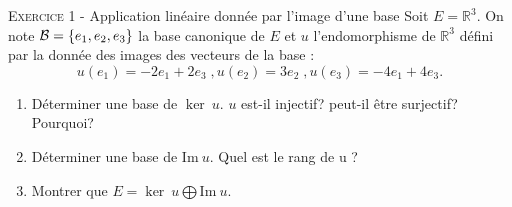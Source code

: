 

\newcommand{\mtn}{\mathbb{N}}
\newcommand{\mtns}{\mathbb{N}^*}
\newcommand{\mtz}{\mathbb{Z}}
\newcommand{\mtr}{\mathbb{R}}
\newcommand{\mtk}{\mathbb{K}}
\newcommand{\mtq}{\mathbb{Q}}
\newcommand{\mtc}{\mathbb{C}}
\newcommand{\mch}{\mathcal{H}}
\newcommand{\mcp}{\mathcal{P}}
\newcommand{\mcb}{\mathcal{B}}
\newcommand{\mcl}{\mathcal{L}}
\newcommand{\mcm}{\mathcal{M}}
\newcommand{\mcc}{\mathcal{C}}
\newcommand{\mcmn}{\mathcal{M}}
\newcommand{\mcmnr}{\mathcal{M}_n(\mtr)}
\newcommand{\mcmnk}{\mathcal{M}_n(\mtk)}
\newcommand{\mcsn}{\mathcal{S}_n}
\newcommand{\mcs}{\mathcal{S}}
\newcommand{\mcd}{\mathcal{D}}
\newcommand{\mcsns}{\mathcal{S}_n^{++}}
\newcommand{\glnk}{GL_n(\mtk)}
\newcommand{\mnr}{\mathcal{M}_n(\mtr)}
\DeclareMathOperator{\ch}{ch}
\DeclareMathOperator{\sh}{sh}
\DeclareMathOperator{\vect}{vect}
\DeclareMathOperator{\card}{card}
\DeclareMathOperator{\comat}{comat}
\DeclareMathOperator{\imv}{Im}
\DeclareMathOperator{\rang}{rg}
\DeclareMathOperator{\Fr}{Fr}
\DeclareMathOperator{\diam}{diam}
\DeclareMathOperator{\supp}{supp}
\newcommand{\veps}{\varepsilon}
\newcommand{\mcu}{\mathcal{U}}
\newcommand{\mcun}{\mcu_n}
\newcommand{\dis}{\displaystyle}
\newcommand{\croouv}{[\![}
\newcommand{\crofer}{]\!]}
\newcommand{\rab}{\mathcal{R}(a,b)}
\newcommand{\pss}[2]{\langle #1,#2\rangle}

 

\begin{center}\textsc{{\huge }}\end{center}



\vskip0.3cm\noindent\textsc{Exercice 1} - Application linéaire donnée par l'image d'une base
\vskip0.2cm
Soit $E=\mathbb R^3$. On note ${\cal B}=\{e_1,e_2,e_3\}$ la base canonique de $E$ et $u$ l'endomorphisme de $\mathbb R^3$ défini par la donnée des images des vecteurs de la base : 
$$u(e_1) = -2e_1 +2e_3 \; , u(e_2)=3e_2 \; , u(e_3)=-4e_1 + 4e_3.$$ 
\begin{enumerate}
\item Déterminer une base de $\ker~u$. 
$u$ est-il injectif? peut-il être surjectif? Pourquoi?
\item Déterminer une base de $\textrm{Im}~u$. Quel est le rang de u ?
\item Montrer que $E=\ker~u\bigoplus \textrm{Im}~u$.
\end{enumerate}




